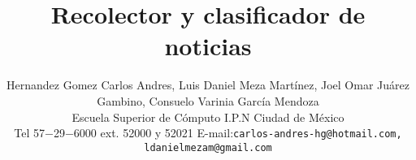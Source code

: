 \title{\LARGE \bf Recolector y clasificador de noticias}

\author{ 

\parbox{5.5 in}{
  \centering 
  Hernandez Gomez Carlos Andres, Luis Daniel Meza Martínez, Joel Omar Juárez Gambino, Consuelo Varinia García Mendoza\\
  {\small Escuela Superior de Cómputo I.P.N Ciudad de México}\\
  Tel 57$-$29$-$6000 ext. 52000 y 52021 E-mail:{\tt\small carlos-andres-hg@hotmail.com, ldanielmezam@gmail.com}


  }
  \hspace*{ 0.5 in}
}
